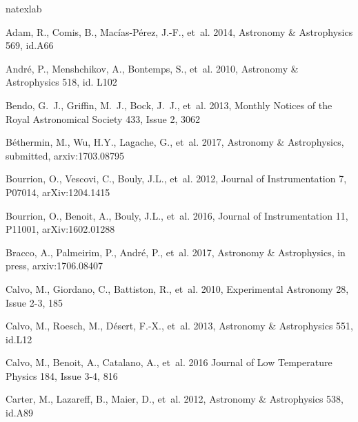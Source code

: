 \begin{thebibliography}{99}

\expandafter\ifx\csname natexlab\endcsname\relax\def\natexlab#1{#1}\fi

Adam, R., Comis, B., Mac\'ias-P\'erez, J.-F., {et~al.} 2014, 
Astronomy \& Astrophysics 569, id.A66


Andr\'e, P., Menshchikov, A., Bontemps, S., {et~al.} 2010, 
Astronomy \& Astrophysics 518, id. L102

Bendo, G.~J., Griffin, M.~J., Bock, J.~J., {et~al.} 2013, 
Monthly Notices of the Royal Astronomical Society 433, Issue 2, 3062

B\'ethermin, M., Wu, H.Y., Lagache, G., {et~al.} 2017, 
Astronomy \& Astrophysics, submitted, arxiv:1703.08795

Bourrion, O., Vescovi, C., Bouly, J.L., {et~al.} 2012, 
Journal of Instrumentation 7, P07014, arXiv:1204.1415

Bourrion, O., Benoit, A., Bouly, J.L., {et~al.} 2016, 
Journal of Instrumentation 11, P11001, arXiv:1602.01288

Bracco, A., Palmeirim, P., Andr\'e, P., {et~al.} 2017, 
Astronomy \& Astrophysics, in press, arxiv:1706.08407

Calvo, M., Giordano, C., Battiston, R., {et~al.} 2010, 
Experimental Astronomy 28, Issue 2-3, 185

Calvo, M., Roesch, M., D\'esert, F.-X., {et~al.} 2013, 
Astronomy \& Astrophysics 551, id.L12

Calvo, M., Benoit, A., Catalano, A., {et~al.} 2016
Journal of Low Temperature Physics 184, Issue 3-4, 816

Carter, M., Lazareff, B., Maier, D., {et~al.} 2012, 
Astronomy \& Astrophysics 538, id.A89


\end{thebibliography}
